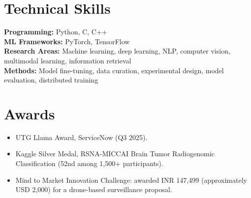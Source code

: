 \documentclass[letterpaper,10pt]{article}
\begin{document}
\section{Technical Skills}
\textbf{Programming:} Python, C, C++\\
\textbf{ML Frameworks:} PyTorch, TensorFlow\\
\textbf{Research Areas:} Machine learning, deep learning, NLP, computer vision, multimodal learning, information retrieval\\
\textbf{Methods:} Model fine-tuning, data curation, experimental design, model evaluation, distributed training

\section{Awards}
\begin{itemize}
  \item UTG Llama Award, ServiceNow (Q3 2025).
  \item Kaggle Silver Medal, RSNA-MICCAI Brain Tumor Radiogenomic Classification (52nd among 1,500+ participants).
  \item Mind to Market Innovation Challenge: awarded INR 147,499 (approximately USD 2,000) for a drone-based surveillance proposal.
\end{itemize}
\end{document}
